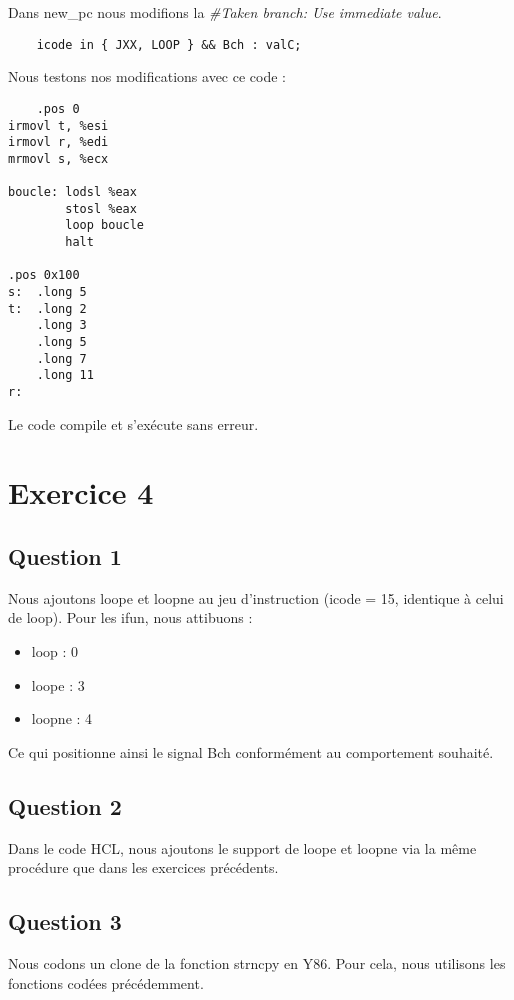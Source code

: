 \documentclass[a4paper,10pt]{article}
\begin{document}
Dans new\_pc nous modifions la \textit{\#Taken branch: Use immediate value}.

\begin{verbatim}
    icode in { JXX, LOOP } && Bch : valC;
\end{verbatim}

Nous testons nos modifications avec ce code :

\begin{verbatim}
    .pos 0
irmovl t, %esi
irmovl r, %edi
mrmovl s, %ecx

boucle: lodsl %eax
        stosl %eax
        loop boucle
        halt

.pos 0x100
s:  .long 5
t:  .long 2
    .long 3
    .long 5
    .long 7
    .long 11
r:

\end{verbatim}
Le code compile et s'exécute sans erreur.

\section{Exercice 4}
\subsection{Question 1}
Nous ajoutons loope et loopne au jeu d'instruction (icode = 15, identique à celui de loop).
Pour les ifun, nous attibuons :
\begin{itemize}
    \item loop : 0
    \item loope : 3
    \item loopne : 4
\end{itemize}
Ce qui positionne ainsi le signal Bch conformément au comportement souhaité.

\subsection{Question 2}
Dans le code HCL, nous ajoutons le support de loope et loopne via la même procédure que dans les exercices précédents.

\subsection{Question 3}
Nous codons un clone de la fonction strncpy en Y86.
Pour cela, nous utilisons les fonctions codées précédemment.
\end{document}
